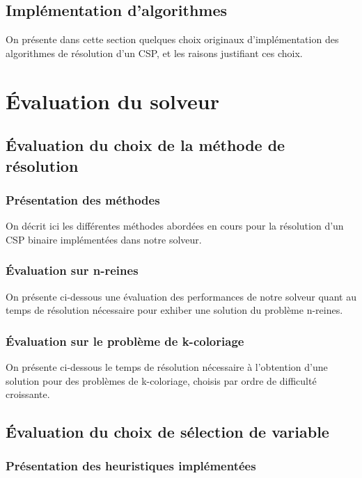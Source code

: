 \documentclass[14pt]{article}
\begin{document}
\subsection{Implémentation d'algorithmes}

On présente dans cette section quelques choix originaux d'implémentation des algorithmes de résolution d'un CSP, et les raisons justifiant ces choix.

\clearpage

\section{Évaluation du solveur}

\subsection{Évaluation du choix de la méthode de résolution}

\subsubsection{Présentation des méthodes}

On décrit ici les différentes méthodes abordées en cours pour la résolution d'un CSP binaire implémentées dans notre solveur.

\subsubsection{Évaluation sur n-reines}

On présente ci-dessous une évaluation des performances de notre solveur quant au temps de résolution nécessaire pour exhiber une solution du problème n-reines.

\subsubsection{Évaluation sur le problème de k-coloriage}

On présente ci-dessous le temps de résolution nécessaire à l'obtention d'une solution pour des problèmes de k-coloriage, choisis par ordre de difficulté croissante.

\subsection{Évaluation du choix de sélection de variable}

\subsubsection{Présentation des heuristiques implémentées}
\end{document}
